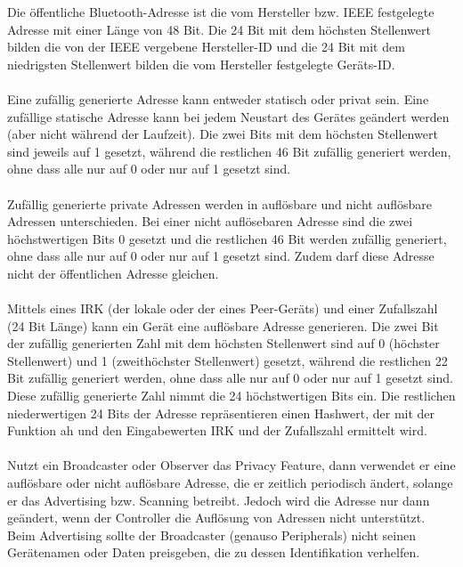 Die öffentliche Bluetooth-Adresse ist die vom Hersteller bzw. IEEE festgelegte Adresse mit einer Länge von 48 Bit. Die 24 Bit mit dem höchsten Stellenwert bilden die von der IEEE vergebene Hersteller-ID und die 24 Bit mit dem niedrigsten Stellenwert bilden die vom Hersteller festgelegte Geräts-ID. \cite{BtSpec4.2_2576}
\\\\
Eine zufällig generierte Adresse kann entweder statisch oder privat sein. Eine zufällige statische Adresse kann bei jedem Neustart des Gerätes geändert werden (aber nicht während der Laufzeit). Die zwei Bits mit dem höchsten Stellenwert sind jeweils auf 1 gesetzt, während die restlichen 46 Bit zufällig generiert werden, ohne dass alle nur auf 0 oder nur auf 1 gesetzt sind.
\\\\
Zufällig generierte private Adressen werden in auflösbare und nicht auflösbare Adressen unterschieden. Bei einer nicht auflösebaren Adresse sind die zwei höchstwertigen Bits 0 gesetzt und die restlichen 46 Bit werden zufällig generiert, ohne dass alle nur auf 0 oder nur auf 1 gesetzt sind. Zudem darf diese Adresse nicht der öffentlichen Adresse gleichen.
\\\\
Mittels eines IRK (der lokale oder der eines Peer-Geräts) und einer Zufallszahl (24 Bit Länge) kann ein Gerät eine auflösbare Adresse generieren. Die zwei Bit der zufällig generierten Zahl mit dem höchsten Stellenwert sind auf 0 (höchster Stellenwert) und 1 (zweithöchster Stellenwert) gesetzt, während die restlichen 22 Bit zufällig generiert werden, ohne dass alle nur auf 0 oder nur auf 1 gesetzt sind. Diese zufällig generierte Zahl nimmt die 24 höchstwertigen Bits ein. Die restlichen niederwertigen 24 Bits der Adresse repräsentieren einen Hashwert, der mit der Funktion ah \cite{BtSpec4.2_2287} 
und den Eingabewerten IRK und der Zufallszahl ermittelt wird. \cite{BtSpec4.2_2577-2579}
\\\\
Nutzt ein Broadcaster oder Observer das Privacy Feature, dann verwendet er eine auflösbare oder nicht auflösbare Adresse, die er zeitlich periodisch ändert, solange er das Advertising bzw. Scanning betreibt. Jedoch wird die Adresse nur dann geändert, wenn der Controller die Auflösung von Adressen nicht unterstützt. Beim Advertising sollte der Broadcaster (genauso Peripherals) nicht seinen Gerätenamen oder Daten preisgeben, die zu dessen Identifikation verhelfen. \cite{BtSpec4.2_2078-2079}
